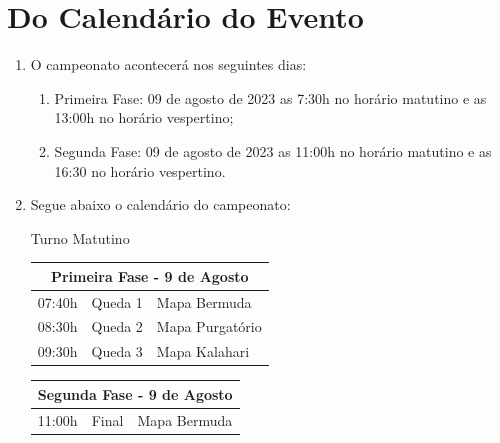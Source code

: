 \section*{Do Calendário do Evento}

\begin{enumerate}[start=1,label={\bfseries Art. \arabic*$^\circ$ - }, resume]
    \item O campeonato acontecerá nos seguintes dias:
        \begin{enumerate}[label={\bfseries \Roman* - }]
            \item Primeira Fase: 09 de agosto de 2023 as 7:30h no horário matutino
                e as 13:00h no horário vespertino;
            \item Segunda Fase: 09 de agosto de 2023 as 11:00h no horário matutino
                e as 16:30 no horário vespertino.
        \end{enumerate}
    \item Segue abaixo o calendário do campeonato:

    \begin{center}
        Turno Matutino
    \end{center}
    \begin{multicols}{2}
        \begin{flushleft}
            \begin{tabular}{l l l}
                \hline
                \multicolumn{3}{c}{Primeira Fase - 9 de Agosto}\\
                \hline
                07:40h & Queda 1 & Mapa Bermuda \\
                08:30h & Queda 2 & Mapa Purgatório \\
                09:30h & Queda 3 & Mapa Kalahari\\
                \hline
            \end{tabular}
        \end{flushleft}

        \begin{flushleft}
            \begin{tabular}{l l l}
                \hline
                \multicolumn{3}{c}{Segunda Fase - 9 de Agosto}\\
                \hline
                11:00h & Final & Mapa Bermuda\\
                \hline
            \end{tabular}
        \end{flushleft}
    \end{multicols}


\end{enumerate}
